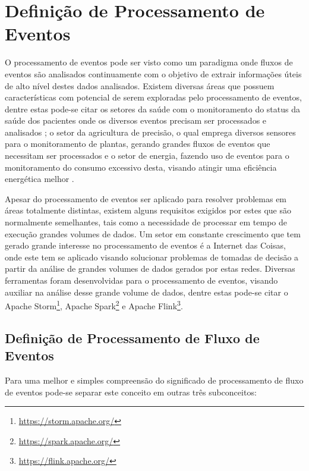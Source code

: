 \documentclass[ti,table]{texufpel} %
\begin{document}
\section{Definição de Processamento de Eventos} 

O processamento de eventos pode ser visto como um paradigma onde fluxos de eventos são analisados continuamente com o objetivo de extrair informações úteis de alto nível destes dados analisados. Existem diversas áreas que possuem características com potencial de serem exploradas pelo processamento de eventos, dentre estas pode-se citar os setores da saúde com o monitoramento do status da saúde dos pacientes onde os diversos eventos precisam ser processados e analisados \cite{weiner2008health}; o setor da agricultura de precisão, o qual emprega diversos sensores para o monitoramento de plantas, gerando grandes fluxos de eventos que necessitam ser processados \cite{garcia2011wireless} e o setor de energia, fazendo uso de eventos para o monitoramento do consumo excessivo desta, visando atingir uma eficiência energética melhor \cite{vijayaraghavan2010automated}.  

  

Apesar do processamento de eventos ser aplicado para resolver problemas em áreas totalmente distintas, existem alguns requisitos exigidos por estes que são normalmente semelhantes, tais como a necessidade de processar em tempo de execução grandes volumes de dados. Um setor em constante  crescimento que tem gerado grande interesse no processamento de eventos é a Internet das Coisas, onde este tem se aplicado visando solucionar problemas de tomadas de decisão a partir da análise de grandes volumes de dados gerados por estas redes. Diversas ferramentas foram desenvolvidas para o processamento de eventos, visando auxiliar na análise desse grande volume de dados, dentre estas pode-se citar o Apache Storm\footnote{\url{https://storm.apache.org/}}, Apache Spark\footnote{\url{https://spark.apache.org/}} e Apache Flink\footnote{\url{https://flink.apache.org/}}. 

  

\subsection{Definição de Processamento de Fluxo de Eventos} 

  

Para uma melhor e simples compreensão do significado de processamento de fluxo de eventos pode-se separar este conceito em outras três subconceitos: 
\end{document}
